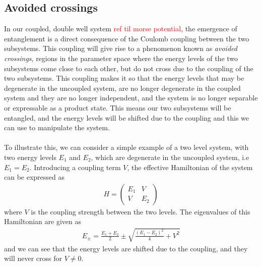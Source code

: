 \documentclass{subfiles}
\begin{document}
\subsection*{Avoided crossings}\label{sec:avoided_crossings}
In our coupled, double well system \textcolor{red}{ref til morse potential}, the emergence of entanglement is a direct consequence of the Coulomb coupling between the two subsystems. This coupling will give rise to a phenomenon known as \emph{avoided crossings}\cite{nazir2005anticrossings}, regions in the parameter space where the energy levels of the two subsystems come close to each other, but do not cross due to the coupling of the two subsystems. This coupling makes it so that the energy levels that may be degenerate in the uncoupled system, are no longer degenerate in the coupled system and they are no longer independent, and the system is no longer separable or expressable as a product state. This means our two subsystems will be entangled, and the energy levels will be shifted due to the coupling and this we can use to manipulate the system. \\ \\
To illustrate this, we can consider a simple example of a two level system, with two energy levels $E_1$ and $E_2$, which are degenerate in the uncoupled system, i.e $E_1 = E_2$. Introducing a coupling term $V$, the effective Hamiltonian of the system can be expressed as
\begin{align*}
    H = \begin{pmatrix}
        E_1 & V \\
        V & E_2
    \end{pmatrix}
\end{align*}
where $V$ is the coupling strength between the two levels. The eigenvalues of this Hamiltonian are given as
\begin{align*}
    E_\pm = \frac{E_1 + E_2}{2} \pm \sqrt{\frac{(E_1 - E_2)^2}{4} + V^2}
\end{align*}
and we can see that the energy levels are shifted due to the coupling, and they will never cross for $V\neq0$. \\ \\
\end{document}
